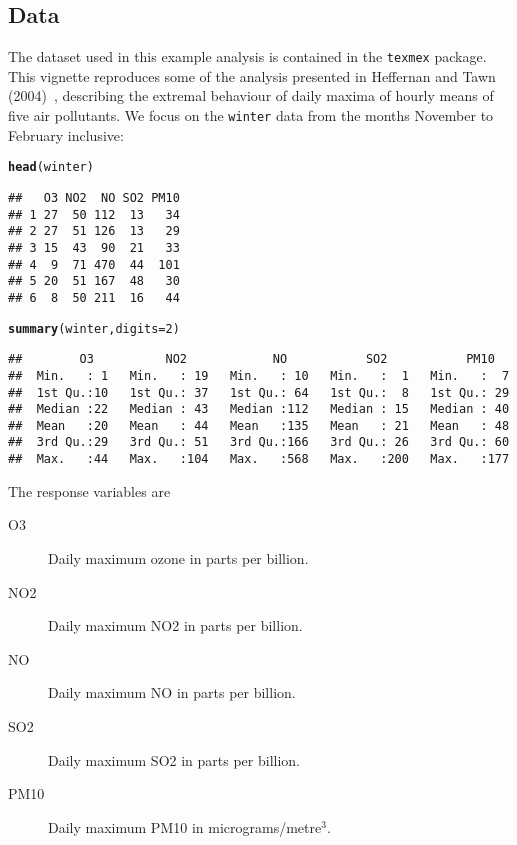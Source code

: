 \documentclass[10pt]{article}\usepackage[]{graphicx}\usepackage[]{color}
\makeatletter
\newcommand{\hlnum}[1]{\textcolor[rgb]{0.686,0.059,0.569}{#1}}%
\newcommand{\hlstd}[1]{\textcolor[rgb]{0.345,0.345,0.345}{#1}}%
\newcommand{\hlkwc}[1]{\textcolor[rgb]{0.333,0.667,0.333}{#1}}%
\newcommand{\hlkwd}[1]{\textcolor[rgb]{0.737,0.353,0.396}{\textbf{#1}}}%
\newenvironment{kframe}{%
 \def\at@end@of@kframe{}%
 \ifinner\ifhmode%
  \def\at@end@of@kframe{\end{minipage}}%
  \begin{minipage}{\columnwidth}%
 \fi\fi%
 \def\FrameCommand##1{\hskip\@totalleftmargin \hskip-\fboxsep
 \colorbox{shadecolor}{##1}\hskip-\fboxsep
     \hskip-\linewidth \hskip-\@totalleftmargin \hskip\columnwidth}%
 \MakeFramed {\advance\hsize-\width
   \@totalleftmargin\z@ \linewidth\hsize
   \@setminipage}}%
 {\par\unskip\endMakeFramed%
 \at@end@of@kframe}
\newenvironment{knitrout}{}{} %
\makeatother
\begin{document}
\subsection{Data}
%
The dataset used in this example analysis is contained in the {\tt texmex}
package. This vignette reproduces some of the analysis presented in Heffernan
and Tawn (2004)~\cite{heffernanTawn}, describing the extremal behaviour of daily
maxima of hourly means of five air pollutants.  We focus on the {\tt winter}
data from the months November to February inclusive:
\begin{knitrout}
\color{fgcolor}\begin{kframe}
\begin{alltt}
\hlkwd{head}\hlstd{(winter)}
\end{alltt}
\begin{verbatim}
##   O3 NO2  NO SO2 PM10
## 1 27  50 112  13   34
## 2 27  51 126  13   29
## 3 15  43  90  21   33
## 4  9  71 470  44  101
## 5 20  51 167  48   30
## 6  8  50 211  16   44
\end{verbatim}
\begin{alltt}
\hlkwd{summary}\hlstd{(winter,}\hlkwc{digits}\hlstd{=}\hlnum{2}\hlstd{)}
\end{alltt}
\begin{verbatim}
##        O3          NO2            NO           SO2           PM10    
##  Min.   : 1   Min.   : 19   Min.   : 10   Min.   :  1   Min.   :  7  
##  1st Qu.:10   1st Qu.: 37   1st Qu.: 64   1st Qu.:  8   1st Qu.: 29  
##  Median :22   Median : 43   Median :112   Median : 15   Median : 40  
##  Mean   :20   Mean   : 44   Mean   :135   Mean   : 21   Mean   : 48  
##  3rd Qu.:29   3rd Qu.: 51   3rd Qu.:166   3rd Qu.: 26   3rd Qu.: 60  
##  Max.   :44   Max.   :104   Max.   :568   Max.   :200   Max.   :177
\end{verbatim}
\end{kframe}
\end{knitrout}

The response variables are
\begin{description}
\item[O3]Daily maximum ozone in parts per billion.
\item[NO2]Daily maximum NO2 in parts per billion.
\item[NO]Daily maximum NO in parts per billion.
\item[SO2]Daily maximum SO2 in parts per billion.
\item[PM10]Daily maximum PM10 in micrograms/metre$^3$.
\end{description}
\end{document}
